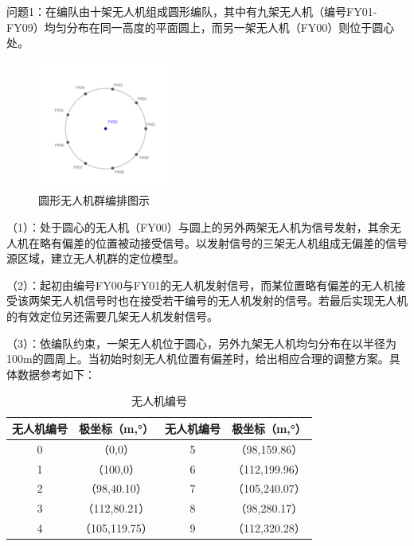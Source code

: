 问题1：在编队由十架无人机组成圆形编队，其中有九架无人机（编号FY01-FY09）均匀分布在同一高度的平面圆上，而另一架无人机（FY00）则位于圆心处。

\begin{figure}[h]
    \centering
    \includegraphics[scale=0.7]{../res/circleFormation.png}
    \caption{圆形无人机群编排图示}
\end{figure}

（1）：处于圆心的无人机（FY00）与圆上的另外两架无人机为信号发射，其余无人机在略有偏差的位置被动接受信号。以发射信号的三架无人机组成无偏差的信号源区域，建立无人机群的定位模型。

（2）：起初由编号FY00与FY01的无人机发射信号，而某位置略有偏差的无人机接受该两架无人机信号时也在接受若干编号的无人机发射的信号。若最后实现无人机的有效定位另还需要几架无人机发射信号。

（3）：依编队约束，一架无人机位于圆心，另外九架无人机均匀分布在以半径为100m的圆周上。当初始时刻无人机位置有偏差时，给出相应合理的调整方案。具体数据参考如下：

\begin{table}[h]
    \centering
    \caption{无人机编号}
    \begin{tabular}{cc|cc}
        \toprule
        无人机编号& 极坐标（m,°）&  无人机编号& 极坐标（m,°）\\
        \midrule
        0&（0,0）&5	&（98,159.86）\\
    
        1	&（100,0）&	6&	（112,199.96）\\
        
        2	&（98,40.10）&	7	&（105,240.07）\\
        
        3	&（112,80.21）&	8	&（98,280.17）\\
        
        4	&（105,119.75）&	9&	（112,320.28）\\
        \bottomrule
    \end{tabular}
\end{table}

